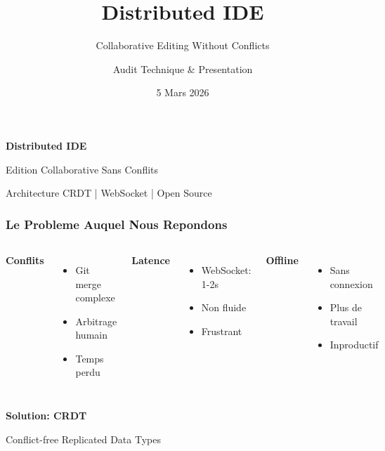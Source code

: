 \documentclass[aspectratio=16:9]{beamer}
\title{Distributed IDE}
\subtitle{Collaborative Editing Without Conflicts}
\author{Audit Technique \& Presentation}
\date{5 Mars 2026}
\begin{document}
{
\begin{frame}[plain]
  \centering
  \vspace{1.5cm}
  {\fontsize{60}{70}\selectfont\textbf{\textcolor{DistribIDEBlue}{Distributed IDE}}}
  
  \vspace{0.5cm}
  
  {\fontsize{28}{32}\selectfont Edition Collaborative Sans Conflits}
  
  \vspace{1cm}
  
  {\fontsize{18}{20}\selectfont\textcolor{AccentOrange}{Architecture CRDT  |  WebSocket  |  Open Source}}
\end{frame}
}

\begin{frame}
  \frametitle{Le Probleme Auquel Nous Repondons}
  
  \begin{columns}[T]
    \centering
    \textbf{Conflits}
    \begin{itemize}
      \item Git merge complexe
      \item Arbitrage humain
      \item Temps perdu
    \end{itemize}
    
    \centering
    \textbf{Latence}
    \begin{itemize}
      \item WebSocket: 1-2s
      \item Non fluide
      \item Frustrant
    \end{itemize}
    
    \centering
    \textbf{Offline}
    \begin{itemize}
      \item Sans connexion
      \item Plus de travail
      \item Inproductif
    \end{itemize}
  \end{columns}
  
  \vspace{1cm}
  
  \centering
  \Large\textbf{\textcolor{SuccessGreen}{Solution: CRDT}}
  
  {\small Conflict-free Replicated Data Types}
\end{frame}
\end{document}
